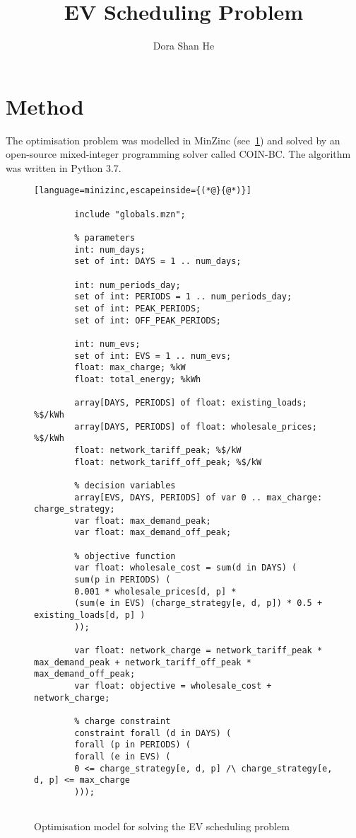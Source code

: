 \documentclass[a4paper]{llncs}
\title{EV Scheduling Problem}
\author{Dora Shan He}
\institute{
	Monash University
	\\\texttt{dora.shan.he@gmail.com}}
\begin{document}
\maketitle

\section{Method}

The optimisation problem was modelled in MinZinc (see~\ref{model:mip}) and solved by an open-source mixed-integer programming solver called COIN-BC. The algorithm was written in Python 3.7. 

\begin{figure}[hp!]
	\centering
	\caption{Optimisation model for solving the EV scheduling problem}
	\label{model:mip}
	\begin{lstlisting}[language=minizinc,escapeinside={(*@}{@*)}]
		
		include "globals.mzn";
		
		% parameters
		int: num_days;
		set of int: DAYS = 1 .. num_days;
		
		int: num_periods_day;
		set of int: PERIODS = 1 .. num_periods_day;
		set of int: PEAK_PERIODS;
		set of int: OFF_PEAK_PERIODS;
		
		int: num_evs;
		set of int: EVS = 1 .. num_evs;
		float: max_charge; %kW
		float: total_energy; %kWh
		
		array[DAYS, PERIODS] of float: existing_loads; %$/kWh
		array[DAYS, PERIODS] of float: wholesale_prices; %$/kWh
		float: network_tariff_peak; %$/kW
		float: network_tariff_off_peak; %$/kW
		
		% decision variables
		array[EVS, DAYS, PERIODS] of var 0 .. max_charge: charge_strategy;
		var float: max_demand_peak; 
		var float: max_demand_off_peak;
		
		% objective function
		var float: wholesale_cost = sum(d in DAYS) (
		sum(p in PERIODS) (
		0.001 * wholesale_prices[d, p] * 
		(sum(e in EVS) (charge_strategy[e, d, p]) * 0.5 + existing_loads[d, p] )
		));
		
		var float: network_charge = network_tariff_peak * max_demand_peak + network_tariff_off_peak * max_demand_off_peak;
		var float: objective = wholesale_cost + network_charge;
		
		% charge constraint
		constraint forall (d in DAYS) (
		forall (p in PERIODS) (
		forall (e in EVS) (
		0 <= charge_strategy[e, d, p] /\ charge_strategy[e, d, p] <= max_charge
		)));
		

\end{lstlisting}
\end{figure}
\end{document}
